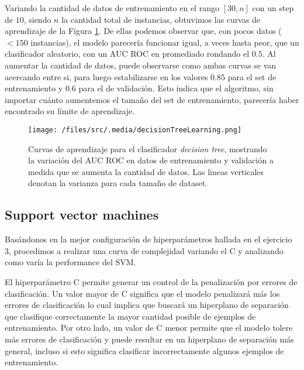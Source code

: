 
Variando la cantidad de datos de entrenamiento en el rango $[30, n]$ con un step de $10$, siendo $n$ la cantidad total de instancias, obtuvimos las curvas de aprendizaje de la Figura \ref{decisionTreeLearning}. De ellas podemos observar que, con pocos datos ($< 150$ instancias), el modelo parecería funcionar igual, a veces hasta peor, que un clasificador aleatorio, con un AUC ROC en promediado rondando el $0.5$. Al aumentar la cantidad de datos, puede observarse como ambas curvas se van acercando entre si, para luego estabilizarse en los valores $0.85$ para el set de entrenamiento y $0.6$ para el de validación. Esto indica que el algoritmo, sin importar cuánto aumentemos el tamaño del set de entrenamiento, parecería haber encontrado su límite de aprendizaje.

\begin{figure}[!htbp]
    \centering
    \texttt{[image: /files/src/.media/decisionTreeLearning.png]}
    \caption{Curvas de aprendizaje para el clasificador \textit{decision tree}, mostrando la variación del AUC ROC en datos de entrenamiento y validación a medida que se aumenta la cantidad de datos. Las lineas verticales denotan la varianza para cada tamaño de dataset.}
    \label{decisionTreeLearning}
\end{figure}


\subsection{Support vector machines}

Basándonos en la mejor configuración de hiperparámetros hallada en el ejercicio 3, procedimos a realizar una curva de complejidad variando el C y analizando como varía la performance del SVM. 

El hiperparámetro C permite generar un control de la penalización por errores de clasificación. Un valor mayor de C significa que el modelo penalizará más los errores de clasificación lo cual implica que buscará un hiperplano de separación que clasifique correctamente la mayor cantidad posible de ejemplos de entrenamiento. Por otro lado, un valor de C menor permite que el modelo tolere más errores de clasificación y puede resultar en un hiperplano de separación más general, incluso si esto significa clasificar incorrectamente algunos ejemplos de entrenamiento.

